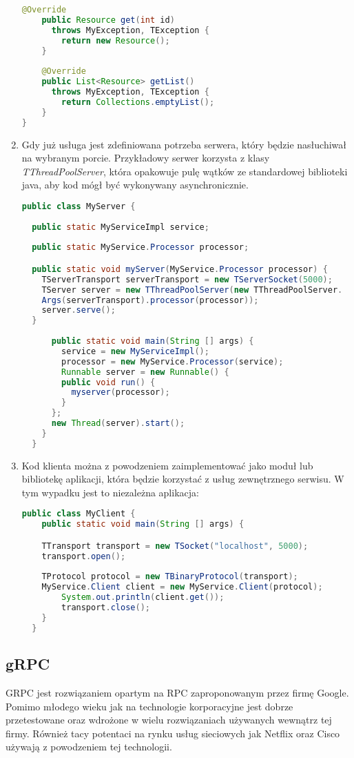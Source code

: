 \begin{enumerate}
\begin{lstlisting}[language=java, caption=Implementacja kodu usługi]
    @Override
    public Resource get(int id) 
      throws MyException, TException {
        return new Resource();
    }
    
    @Override
    public List<Resource> getList() 
      throws MyException, TException {
        return Collections.emptyList();
    }
}
  \end{lstlisting}
  \item Gdy już usługa jest zdefiniowana potrzeba serwera, który będzie nasłuchiwał na wybranym porcie. Przykładowy serwer korzysta z klasy \textit{TThreadPoolServer}, która opakowuje pulę wątków ze standardowej biblioteki java, aby kod mógł być wykonywany asynchronicznie.
        \begin{lstlisting}[language=java, caption=Kod serwera]
public class MyServer {
  
  public static MyServiceImpl service;
  
  public static MyService.Processor processor;

  public static void myServer(MyService.Processor processor) {
    TServerTransport serverTransport = new TServerSocket(5000);
    TServer server = new TThreadPoolServer(new TThreadPoolServer.
    Args(serverTransport).processor(processor));
    server.serve();
  }
  
      public static void main(String [] args) {
        service = new MyServiceImpl();
        processor = new MyService.Processor(service);
        Runnable server = new Runnable() {
        public void run() {
          myserver(processor);
        }
      };
      new Thread(server).start();
    }
  }
  \end{lstlisting}
  \item Kod klienta można z powodzeniem zaimplementować jako moduł lub bibliotekę aplikacji, która będzie korzystać z usług zewnętrznego serwisu. W tym wypadku jest to niezależna aplikacja:
        \begin{lstlisting}[language=java, caption=Kod klienta]
  public class MyClient {
    public static void main(String [] args) {

    TTransport transport = new TSocket("localhost", 5000);
    transport.open();
    
    TProtocol protocol = new TBinaryProtocol(transport);
    MyService.Client client = new MyService.Client(protocol);
        System.out.println(client.get());
        transport.close();
    }
  }
  \end{lstlisting}
\end{enumerate}
\subsection{gRPC}
GRPC jest rozwiązaniem opartym na RPC zaproponowanym przez firmę Google. Pomimo młodego wieku jak na technologie korporacyjne jest dobrze przetestowane oraz wdrożone w wielu rozwiązaniach używanych wewnątrz tej firmy. Również tacy potentaci na rynku usług sieciowych jak Netflix oraz Cisco używają z powodzeniem tej technologii.
